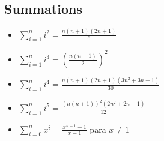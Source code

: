 \documentclass[10pt,letterpaper,twocolumn,twosided]{article}
\begin{document}
\subsection{Summations}

\begin{itemize}
\item	$\sum_{i=1}^{n} i^2 = \frac{n(n+1)(2n+1)}{6}$
\item	$\sum_{i=1}^{n} i^3 = (\frac{n(n+1)}{2})^2$
\item	$\sum_{i=1}^{n} i^4 = \frac{n(n+1)(2n+1)(3n^2+3n-1)}{30}$
\item	$\sum_{i=1}^{n} i^5 = \frac{(n(n+1))^2(2n^2+2n-1)}{12}$
\item	$\sum_{i=0}^{n} x^i = \frac{x^{n+1}-1}{x-1}$ para $x \neq 1$	
\end{itemize}
\end{document}
